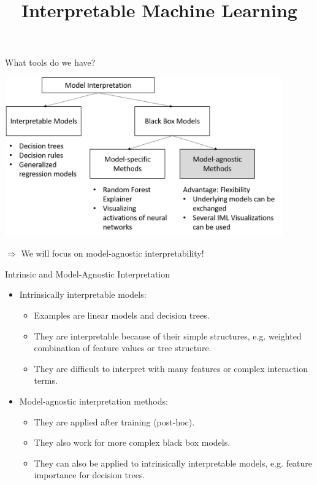 \documentclass[11pt,compress,t,notes=noshow, xcolor=table]{beamer}
\title{Interpretable Machine Learning}
\institute{\href{https://compstat-lmu.github.io/lecture_iml/}{compstat-lmu.github.io/lecture\_iml}}
\date{}
\begin{document}


\newcommand{\titlefigure}{figure/open_blackbox}
\newcommand{\learninggoals}{
\item What is interpretable machine learning (IML)? \\
      What is the purpose of IML?
      }



\begin{vbframe}{What tools do we have?}
 \begin{center}
  \includegraphics[width=0.9\textwidth]{figure/overview}
 \end{center}
 $\Rightarrow$ We will focus on model-agnostic interpretability!
\end{vbframe}

\begin{vbframe}{Intrinsic and Model-Agnostic Interpretation}
\begin{itemize}
  \item Intrinsically interpretable models:
  \begin{itemize}
  \item Examples are linear models and decision trees.
  \item They are interpretable because of their simple structures, e.g. 
  weighted combination of feature values or tree structure. 
  \item They are difficult to interpret with many features or complex interaction terms.
  \end{itemize}
  \lz
  \item Model-agnostic interpretation methods:
  \begin{itemize}
  \item They are applied after training (post-hoc).
  \item They also work for more complex black box models.
  \item They can also be applied to intrinsically interpretable models, e.g.
    feature importance for decision trees. 
  \end{itemize}
\end{itemize}
\end{vbframe}
\end{document}
